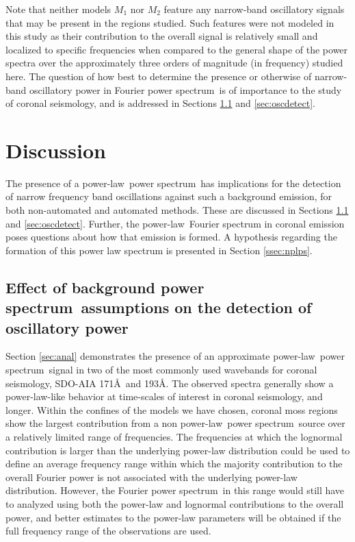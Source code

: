 \documentclass[onecolumn]{emulateapj}
\newcommand{\PS}{power spectrum}
\newcommand{\PL}{power-law}
\newcommand{\Fps}{Fourier \PS}
\begin{document}
Note that neither models $M_{1}$ nor $M_{2}$ feature any narrow-band
oscillatory signals that may be present in the regions studied.  Such
features were not modeled in this study as their contribution to the
overall signal is relatively small and localized to specific
frequencies when compared to the general shape of the power spectra
over the approximately three orders of magnitude (in frequency)
studied here.  The question of how best to determine the presence or
otherwise of narrow-band oscillatory power in \Fps\ is of importance
to the study of coronal seismology, and is addressed in Sections
\ref{ssec:corseis} and \ref{sec:oscdetect}.

\section{Discussion}
The presence of a \PL\ \PS\ has implications for the detection of
narrow frequency band oscillations against such a background emission,
for both non-automated and automated methods.  These are discussed in
Sections \ref{ssec:corseis} and \ref{sec:oscdetect}.  Further, the
\PL\ Fourier spectrum in coronal emission poses questions about how
that emission is formed.  A hypothesis regarding the formation of this
power law spectrum is presented in Section \ref{ssec:nplps}.

\subsection{Effect of background \PS\ assumptions on the
  detection of oscillatory power}
\label{ssec:corseis}

Section \ref{sec:anal} demonstrates the presence of an approximate
\PL\ \PS\ signal in two of the most commonly used wavebands for
coronal seismology, SDO-AIA 171\AA\ and 193\AA.  The observed spectra
generally show a \PL-like behavior at time-scales of interest in
coronal seismology, and longer.  Within the confines of the models we
have chosen, coronal moss regions show the largest contribution from a
non \PL\ \PS\ source over a relatively limited range of frequencies.
The frequencies at which the lognormal contribution is larger than the
underlying power-law distribution could be used to define an average
frequency range within which the majority contribution to the overall
Fourier power is not associated with the underlying power-law
distribution.  However, the \Fps\ in this range would still have to
analyzed using both the power-law and lognormal contributions to the
overall power, and better estimates to the power-law parameters will
be obtained if the full frequency range of the observations are used.
\end{document}
